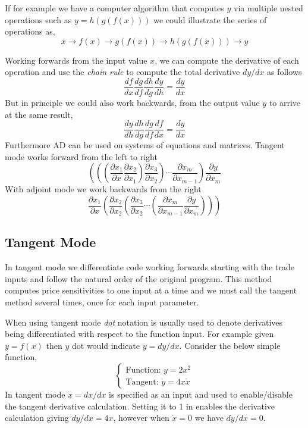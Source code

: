 \documentclass[12pt,a4paper]{book}
\begin{document}
If for example we have a computer algorithm that computes $y$ via multiple nested operations such as $y = h(g(f(x)))$ we could illustrate the series of operations as,
\begin{equation}
x\rightarrow f(x) \rightarrow g(f(x)) \rightarrow h(g(f(x))) \rightarrow y
\end{equation}

Working forwards from the input value $x$, we can compute the derivative of each operation and use the \emph{chain rule} to compute the total derivative $dy/dx$ as follows
\begin{equation}
\frac{df}{dx}\frac{dg}{df}\frac{dh}{dg}\frac{dy}{dh}=\frac{dy}{dx}
\end{equation}
But in principle we could also work backwards, from the output value $y$ to arrive at the same result,
\begin{equation}
\frac{dy}{dh}\frac{dh}{dg}\frac{dg}{df}\frac{df}{dx}=\frac{dy}{dx}
\end{equation}
Furthermore AD can be used on systems of equations and matrices. 
Tangent mode works forward from the left to right
\begin{equation}
\left(\left(\left(\frac{\partial x_1}{\partial x}\frac{\partial x_2}{\partial x_1}\right)\frac{\partial x_3}{\partial x_2}\right)\cdots\frac{\partial x_m}{\partial x_{m-1}}\right)\frac{\partial y}{\partial x_m}
\end{equation}
With adjoint mode we work backwards from the right
\begin{equation}
\frac{\partial x_1}{\partial x}\left(\frac{\partial x_2}{\partial x_2}\left(\frac{\partial x_3}{\partial x_2}\cdots\left(\frac{\partial x_m}{\partial x_{m-1}}\frac{\partial y}{\partial x_m}\right)\right)\right)
\end{equation}

\subsection{Tangent Mode}
In tangent mode we differentiate code working forwards starting with the trade inputs and follow the natural order of the original program. This method computes price sensitivities to one input at a time and we must call the tangent method several times, once for each input parameter.

When using tangent mode \emph{dot} notation is usually used to denote derivatives being differentiated with respect to the function input. For example given $y = f(x)$ then $y$ dot would indicate $\dot{y} = dy/dx$.
Consider the below simple function,
\begin{equation}
\begin{cases}
\text{Function: } y = 2x^2\\
\text{Tangent: } \dot{y} = 4x\dot{x}
\end{cases}
\label{eq:aad_function}
\end{equation}
In tangent mode $\dot{x}=dx/dx$ is specified as an input and used to enable/disable the tangent derivative calculation. Setting it to 1 in enables the derivative calculation giving
$dy/dx = 4x$, however when $\dot{x}= 0$ we have $dy/dx = 0$.
\end{document}
